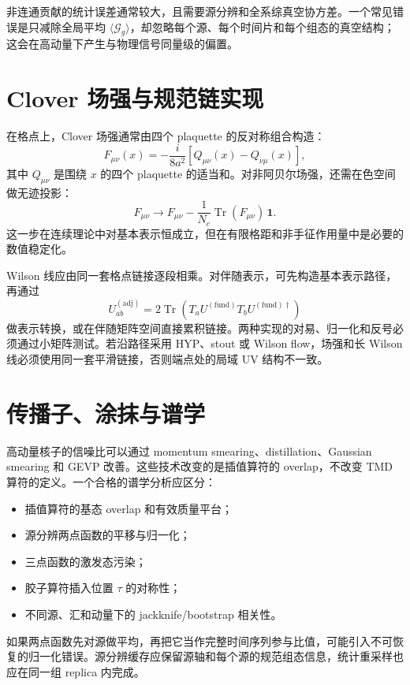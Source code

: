 \documentclass[UTF8,12pt,a4paper,twoside,openany]{ctexbook}
\newcommand{\Tr}{\operatorname{Tr}}
\begin{document}
非连通贡献的统计误差通常较大，且需要源分辨和全系综真空协方差。一个常见错误是只减除全局平均 \(\langle \mathcal G_g\rangle\)，却忽略每个源、每个时间片和每个组态的真空结构；这会在高动量下产生与物理信号同量级的偏置。

\section{Clover 场强与规范链实现}

在格点上，Clover 场强通常由四个 plaquette 的反对称组合构造：
\begin{equation}
  F_{\mu\nu}(x)
  =-\frac{i}{8a^2}\left[Q_{\mu\nu}(x)-Q_{\nu\mu}(x)\right],
  \label{eq:clover}
\end{equation}
其中 \(Q_{\mu\nu}\) 是围绕 \(x\) 的四个 plaquette 的适当和。对非阿贝尔场强，还需在色空间做无迹投影：
\begin{equation}
  F_{\mu\nu}\longrightarrow
  F_{\mu\nu}-\frac{1}{N_c}\Tr(F_{\mu\nu})\,\mathbf 1 .
  \label{eq:traceless}
\end{equation}
这一步在连续理论中对基本表示恒成立，但在有限格距和非手征作用量中是必要的数值稳定化。

Wilson 线应由同一套格点链接逐段相乘。对伴随表示，可先构造基本表示路径，再通过
\begin{equation}
  U^{(\mathrm{adj})}_{ab}
  =2\Tr\left(T_aU^{(\mathrm{fund})}T_bU^{(\mathrm{fund})\dagger}\right)
  \label{eq:adjointlink}
\end{equation}
做表示转换，或在伴随矩阵空间直接累积链接。两种实现的对易、归一化和反号必须通过小矩阵测试。若沿路径采用 HYP、stout 或 Wilson flow，场强和长 Wilson 线必须使用同一套平滑链接，否则端点处的局域 UV 结构不一致。

\section{传播子、涂抹与谱学}

高动量核子的信噪比可以通过 momentum smearing、distillation、Gaussian smearing 和 GEVP 改善\cite{Bali2016,Peardon2009}。这些技术改变的是插值算符的 overlap，不改变 TMD 算符的定义。一个合格的谱学分析应区分：
\begin{itemize}
  \item 插值算符的基态 overlap 和有效质量平台；
  \item 源分辨两点函数的平移与归一化；
  \item 三点函数的激发态污染；
  \item 胶子算符插入位置 \(\tau\) 的对称性；
  \item 不同源、汇和动量下的 jackknife/bootstrap 相关性。
\end{itemize}
如果两点函数先对源做平均，再把它当作完整时间序列参与比值，可能引入不可恢复的归一化错误。源分辨缓存应保留源轴和每个源的规范组态信息，统计重采样也应在同一组 replica 内完成。
\end{document}
